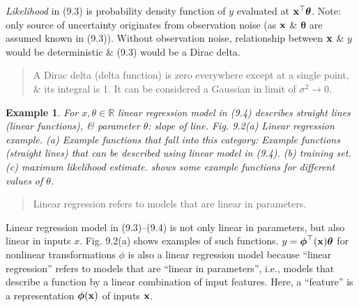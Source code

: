 \documentclass{article}
\newtheorem{example}{Example}
\begin{document}
\begin{itemize}
\begin{itemize}
		{\it Likelihood} in (9.3) is probability density function of $y$ evaluated at ${\bf x}^\top\boldsymbol{\theta}$. Note: only source of uncertainty originates from observation noise (as ${\bf x}$ \& $\boldsymbol{\theta}$ are assumed known in (9.3)). Without observation noise, relationship between ${\bf x}$ \& $y$ would be deterministic \& (9.3) would be a Dirac delta.
		\begin{quote}
			A Dirac delta (delta function) is zero everywhere except at a single point, \& its integral is 1. It can be considered a Gaussian in limit of $\sigma^2\to0$.
		\end{quote}
		
		\begin{example}
			For $x,\theta\in\mathbb{R}$ linear regression model in (9.4) describes straight lines (linear functions), \& parameter $\theta$: slope of line. {\sf Fig. 9.2(a) Linear regression example. (a) Example functions that fall into this category: Example functions (straight lines) that can be described using linear model in (9.4). (b) training set. (c) maximum likelihood estimate.} shows some example functions for different values of $\theta$.
		\end{example}
		
		\begin{quote}
			Linear regression refers to models that are linear in parameters.
		\end{quote}
		Linear regression model in (9.3)--(9.4) is not only linear in parameters, but also linear in inputs $x$. {\sf Fig. 9.2(a)} shows examples of such functions. $y = \boldsymbol{\phi}^\top({\bf x})\boldsymbol{\theta}$ for nonlinear transformations $\phi$ is also a linear regression model because ``linear regression'' refers to models that are ``linear in parameters'', i.e., models that describe a function by a linear combination of input features. Here, a ``feature'' is a representation $\boldsymbol{\phi}({\bf x})$ of inputs ${\bf x}$.
		

\end{itemize}
\end{itemize}
\end{document}
